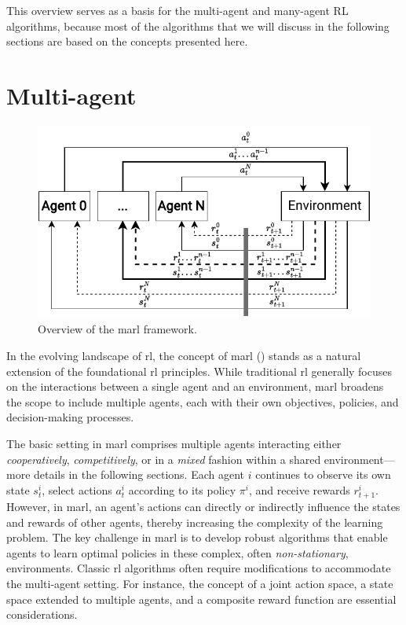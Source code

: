 This overview serves as a basis for the multi-agent and many-agent RL algorithms,
 because most of the algorithms that we will discuss in the following sections are based on the concepts presented here.

\section{Multi-agent}
\begin{figure}
\includegraphics[width=\textwidth]{chapters/img/multi-agent-rl.drawio.pdf}
\caption{Overview of the \ac{marl} framework.}\label{fig:marl:overview}
\end{figure}
In the evolving landscape of \ac{rl}, the concept of \acf{marl} () stands as a natural extension of the foundational \ac{rl} principles. 
 While traditional \ac{rl} generally focuses on the interactions between a single agent and an environment, 
 \ac{marl} broadens the scope to include multiple agents, 
 each with their own objectives, policies, and decision-making processes.

The basic setting in \ac{marl} comprises multiple agents interacting either \emph{cooperatively}, \emph{competitively}, or in a \emph{mixed} fashion within a shared environment---more details in the following sections. 
 Each agent $i$ continues to observe its own state $s_{t}^{i}$, select actions $a_{t}^{i}$ according to its policy $\pi^{i}$, and receive rewards $r_{t+1}^{i}$.
 However, in \ac{marl}, 
 an agent's actions can directly or indirectly influence the states and rewards of other agents, 
 thereby increasing the complexity of the learning problem.
The key challenge in \ac{marl} 
 is to develop robust algorithms that enable agents to learn optimal policies in these complex, often \emph{non-stationary}, environments. 
 Classic \ac{rl} algorithms often require modifications to accommodate the multi-agent setting. 
 For instance, the concept of a joint action space, a state space extended to multiple agents, and a composite reward function are essential considerations.
